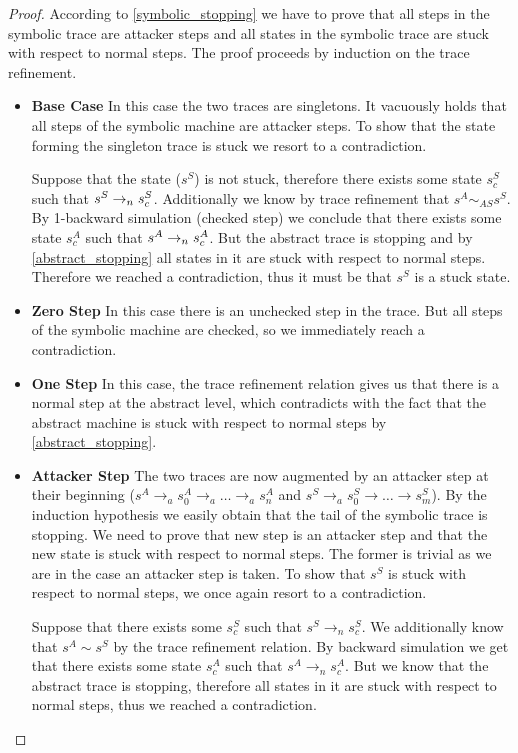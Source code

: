 \begin{proof}
  According to \cref{symbolic_stopping} we have to prove that all steps
  in the symbolic trace are attacker steps and all states in the symbolic
  trace are stuck with respect to normal steps.
  The proof proceeds by induction on the trace refinement.
  \begin{itemize}
  \item \textbf{Base Case} In this case the two traces are singletons.
    It vacuously holds that all steps of the symbolic machine are
    attacker steps. To show that the state forming the singleton trace
    is stuck we resort to a contradiction.

    Suppose that the state ($s^S$) is not stuck, therefore there
    exists some state $s^S_c$ such that
    $s^S\to_ns^S_c$. Additionally we know by trace refinement that
    $s^A \sim_{AS} s^S$. By 1-backward simulation (checked step) we
    conclude that there exists some state $s^A_c$ such that
    $s^A\to_ns^A_c$. But the abstract trace is stopping and by
    \cref{abstract_stopping} all states in it are stuck with respect
    to normal steps. Therefore we reached a contradiction, thus it
    must be that $s^S$ is a stuck state.
  \item \textbf{Zero Step} In this case there is an unchecked step
    in the trace. But all steps of the symbolic machine are checked,
    so we immediately reach a contradiction.
  \item \textbf{One Step} In this case, the trace refinement relation
    gives us that there is a normal step at the abstract level, which
    contradicts with the fact that the abstract machine is stuck
    with respect to normal steps by \cref{abstract_stopping}.
  \item \textbf{Attacker Step} The two traces are now augmented by an
    attacker step at their beginning ($s^A \to_a s^A_0 \to_a \ldots
    \to_a s^A_n$ and $s^S \to_a s^S_0 \to \ldots \to s^S_m$). By the
    induction hypothesis we easily obtain that the tail of the
    symbolic trace is stopping. We need to prove that new step is an
    attacker step and that the new state is stuck with respect to
    normal steps. The former is trivial as we are in the case an
    attacker step is taken. To show that $s^S$ is stuck with
    respect to normal steps, we once again resort to a contradiction.

    Suppose that there exists some $s^S_c$ such that $s^S \to_n s^S_c$.
    We additionally know that $s^A \sim s^S$ by the trace refinement
    relation. By backward simulation we get that there exists
    some state $s^A_c$ such that $s^A \to_n s^A_c$. But we know that
    the abstract trace is stopping, therefore all states in it
    are stuck with respect to normal steps, thus we reached
    a contradiction.
  \end{itemize}
\end{proof}

